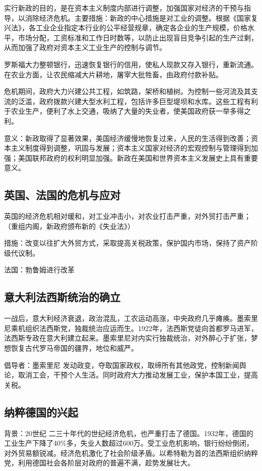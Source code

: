 实行新政的目的，是在资本主义制度内部进行调整，加强国家对经济的干预与指导，以消除经济危机。主要措施：新政的中心措施是对工业的调整。根据《国家复兴法》，各工业企业指定本行业的公平经营规章，确定各企业的生产规模，价格水平，市场分配，工资标准和工作日时数等，以防止出现盲目竞争引起的生产过剩，从而加强了政府对资本主义工业生产的控制与调节。

罗斯福大力整顿银行，迅速恢复银行的信用，使私人现款又存入银行，重新流通。在农业方面，让农民缩减大片耕地，屠宰大批牲畜，由政府付款补贴。

危机期间，政府大力兴建公共工程，如筑路，架桥和植树。为控制一些河流及其支流的泛滥，政府拨款兴建大型水利工程，包括许多巨型堤坝和水库。这些工程有利于农业生产，便利了水上交通，吸纳了大量的失业者，使美国政府获一举多得之利。

意义：新政取得了显著效果，美国经济缓慢地恢复过来，人民的生活得到改善；资本主义制度得到调整，巩固与发展；资本主义国家对经济的宏观控制与管理得到加强；美国联邦政府的权利明显加强。新政在美国和世界资本主义发展史上具有重要意义。

\subsection{英国、法国的危机与应对}
英国的经济危机相对缓和，对工业冲击小，对农业打击严重，对外贸打击严重；（重组内阁，新政府颁布新的《失业法》）

措施：改变以往扩大外贸方式，采取提高关税政策，保护国内市场，保持了资产阶级代议制。

法国：勃鲁姆进行改革

\subsection{意大利法西斯统治的确立}
一战后，意大利经济衰退，政治混乱，工农运动高涨，中央政府几乎瘫痪。墨索里尼乘机组织法西斯党，独裁统治应运而生。1922年，法西斯党徒向首都罗马进军，法西斯专政在意大利建立起来。墨索里尼对内实行独裁统治，对外醉心于扩张，梦想恢复古代罗马帝国的疆界，地位和威严。

倡导者：墨索里尼  发动政变，夺取国家政权，取缔所有其他政党，控制新闻舆论，取消工会，干预个人生活。同时政府大力推动发展工业，保护本国工业，提高关税。

\subsection{纳粹德国的兴起}
背景：20世纪 二三十年代的世纪经济危机，也严重打击了德国。1932年，德国的工业生产下降了40\%多，失业人数超过600万。受工业危机影响，银行纷纷倒闭，对外贸易额锐减。经济危机激化了社会阶级矛盾。以希特勒为首的法西斯组织纳粹党，利用德国社会各阶层对政府的普遍不满，趁势发展壮大。

